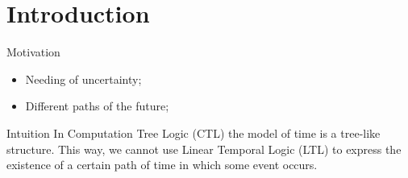 \section{Introduction}
\begin{frame}{Motivation}
	\begin{itemize}
		\item 
		{
			Needing of uncertainty;
			\pause
		} 
		\item 
		{
			Different paths of the future;
		}
	\end{itemize}
\end{frame}
\begin{frame}{Intuition}
	In Computation Tree Logic (CTL) the model of time is a tree-like structure. This way, we cannot use Linear Temporal Logic (LTL) to express the existence of a certain path of time in which some event occurs.
\end{frame}

